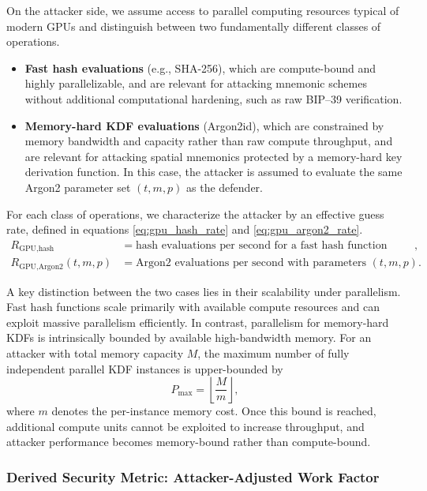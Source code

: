 \documentclass[journal,article,accept,pdftex,moreauthors]{Definitions/mdpi}
\begin{document}
On the attacker side, we assume access to parallel computing resources typical of modern GPUs and distinguish between two fundamentally different classes of operations.
\begin{itemize}
\item \textbf{Fast hash evaluations} (e.g., SHA-256), which are compute-bound and highly parallelizable, and are relevant for attacking mnemonic schemes without additional computational hardening, such as raw BIP--39 verification.
\item \textbf{Memory-hard KDF evaluations} (Argon2id), which are constrained by memory bandwidth and capacity rather than raw compute throughput, and are relevant for attacking spatial mnemonics protected by a memory-hard key derivation function. In this case, the attacker is assumed to evaluate the same Argon2 parameter set $(t, m, p)$ as the defender.
\end{itemize}

For each class of operations, we characterize the attacker by an effective guess rate, defined in equations \ref{eq:gpu_hash_rate} and \ref{eq:gpu_argon2_rate}.
\begin{align}
R_{\text{GPU,hash}} &= \text{hash evaluations per second for a fast hash function (e.g., SHA-256)}, \label{eq:gpu_hash_rate} \\
R_{\text{GPU,Argon2}}(t,m,p) &= \text{Argon2 evaluations per second with parameters }(t,m,p). \label{eq:gpu_argon2_rate}
\end{align}

A key distinction between the two cases lies in their scalability under parallelism. Fast hash functions scale primarily with available compute resources and can exploit massive parallelism efficiently. In contrast, parallelism for memory-hard KDFs is intrinsically bounded by available high-bandwidth memory. For an attacker with total memory capacity $M$, the maximum number of fully independent parallel KDF instances is upper-bounded by
\[
P_{\max} = \left\lfloor \frac{M}{m} \right\rfloor ,
\]
where $m$ denotes the per-instance memory cost. Once this bound is reached, additional compute units cannot be exploited to increase throughput, and attacker performance becomes memory-bound rather than compute-bound.

\subsubsection{Derived Security Metric: Attacker-Adjusted Work Factor}
\end{document}
